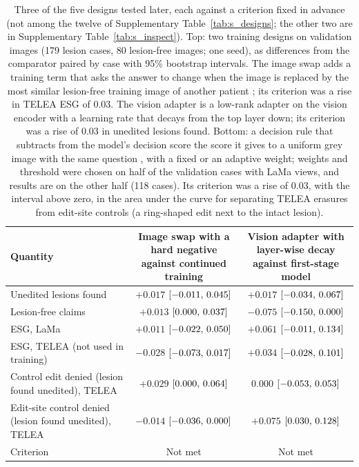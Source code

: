 \begin{table}[!htbp]
\caption{Three of the five designs tested later, each against a criterion fixed in advance (not among the twelve of Supplementary Table~\ref{tab:s_designs}; the other two are in Supplementary Table~\ref{tab:s_inspect}). Top: two training designs on validation images (179 lesion cases, 80 lesion-free images; one seed), as differences from the comparator paired by case with 95\% bootstrap intervals. The image swap adds a training term that asks the answer to change when the image is replaced by the most similar lesion-free training image of another patient \citep{zafar2026coral}; its criterion was a rise in TELEA ESG of 0.03. The vision adapter is a low-rank adapter on the vision encoder with a learning rate that decays from the top layer down; its criterion was a rise of 0.03 in unedited lesions found. Bottom: a decision rule that subtracts from the model's decision score the score it gives to a uniform grey image with the same question \citep{huang2026medcap}, with a fixed or an adaptive weight; weights and threshold were chosen on half of the validation cases with LaMa views, and results are on the other half (118 cases). Its criterion was a rise of 0.03, with the interval above zero, in the area under the curve for separating TELEA erasures from edit-site controls (a ring-shaped edit next to the intact lesion).}
\label{tab:s_designs_later}
\centering
\footnotesize
\begin{adjustbox}{max width=\linewidth}
\begin{tabular}{lcc}
\toprule
Quantity & \shortstack{Image swap with a hard negative\\against continued training} & \shortstack{Vision adapter with layer-wise decay\\against first-stage model} \\
\midrule
Unedited lesions found & $+0.017$ $[-0.011,\,0.045]$ & $+0.017$ $[-0.034,\,0.067]$ \\
Lesion-free claims & $+0.013$ $[0.000,\,0.037]$ & $-0.075$ $[-0.150,\,0.000]$ \\
ESG, LaMa & $+0.011$ $[-0.022,\,0.050]$ & $+0.061$ $[-0.011,\,0.134]$ \\
ESG, TELEA (not used in training) & $-0.028$ $[-0.073,\,0.017]$ & $+0.034$ $[-0.028,\,0.101]$ \\
Control edit denied (lesion found unedited), TELEA & $+0.029$ $[0.000,\,0.064]$ & $0.000$ $[-0.053,\,0.053]$ \\
Edit-site control denied (lesion found unedited), TELEA & $-0.014$ $[-0.036,\,0.000]$ & $+0.075$ $[0.030,\,0.128]$ \\
Criterion & Not met & Not met \\
\bottomrule
\end{tabular}
\end{adjustbox}


\end{table}
